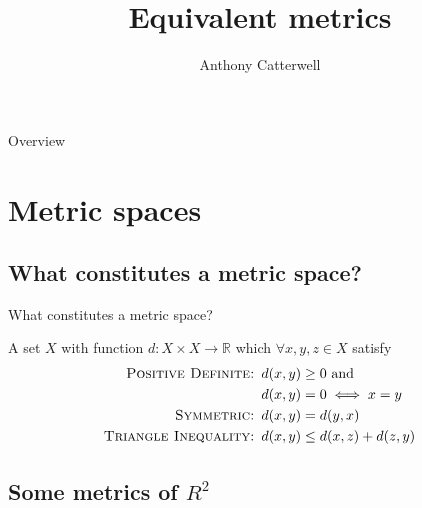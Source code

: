 \documentclass{beamer}
\title{Equivalent metrics}
\author{Anthony Catterwell}
\institute{University of Edinburgh}
\begin{document}
\begin{frame}
    \maketitle
\end{frame}

\begin{frame}{Overview}
    \tableofcontents
\end{frame}

\section{Metric spaces}

\subsection{What constitutes a metric space?}

\begin{frame}{What constitutes a metric space?}
    \begin{definition}
        A set $X$ with function
        $d: X \times X \rightarrow \mathbb{R}$
        which $\forall x, y, z \in X$ satisfy
        \begin{align*}
            \text{\textsc{Positive Definite: }}   & d(x,y) \geq 0 \ \text{and} \\
                                                  & d(x,y) = 0 \iff x = y \\
            \text{\textsc{Symmetric: }}           & d(x,y) = d(y,x) \\
            \text{\textsc{Triangle Inequality: }} & d(x,y) \leq d(x,z) + d(z,y) \\
        \end{align*}
    \end{definition}
\end{frame}

\subsection{Some metrics of $R^2$}
\end{document}
